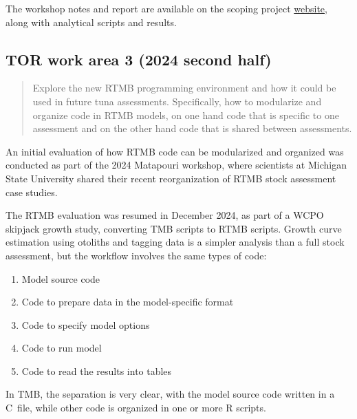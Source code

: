 \documentclass{SCreport}
\newcommand\tree
{https://github.com/PacificCommunity/ofp-sam-transition-plan/tree/main}
\newcommand\cpp{\mbox{C\raisebox{0.5ex}{\tiny\bfseries ++}}}
\begin{document}
The workshop notes and report are available on the scoping project
\href{\tree/workshops/2024-08-matapouri}{website}, along with analytical scripts
and results.

\vspace{1ex}

\subsection{TOR work area 3 (2024 second half)}

\begin{quote}\sf
  Explore the new RTMB programming environment and how it could be used in
  future tuna assessments. Specifically, how to modularize and organize code in
  RTMB models, on one hand code that is specific to one assessment and on the
  other hand code that is shared between assessments.
\end{quote}

\vspace{1ex}

An initial evaluation of how RTMB code can be modularized and organized was
conducted as part of the 2024 Matapouri workshop, where scientists at Michigan
State University shared their recent reorganization of RTMB stock assessment
case studies.

The RTMB evaluation was resumed in December 2024, as part of a WCPO skipjack
growth study, converting TMB scripts to RTMB scripts. Growth curve estimation
using otoliths and tagging data is a simpler analysis than a full stock
assessment, but the workflow involves the same types of code:

\begin{enumerate}
  \item Model source code\\[-4.5ex]
  \item Code to prepare data in the model-specific format\\[-4.5ex]
  \item Code to specify model options\\[-4.5ex]
  \item Code to run model\\[-4.5ex]
  \item Code to read the results into tables
\end{enumerate}

In TMB, the separation is very clear, with the model source code written in a
\cpp\ file, while other code is organized in one or more R scripts.
\end{document}
